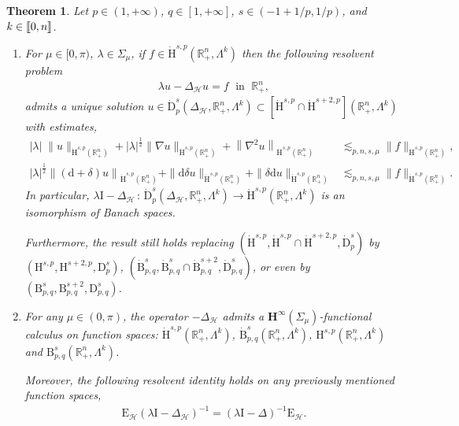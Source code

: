 \documentclass[10pt]{amsart}
\newtheorem{theo}{Theorem}[section]
\theoremstyle{definition}\newtheorem{defi}[theo]{Definition}\newtheorem{rema}[theo]{Remark}\newtheorem{exam}[theo]{Example}\newtheorem{exem}[theo]{Example}\newtheorem{nota}[theo]{Notation}
\newcommand{\bbR}{\mathbb{R}}
\newcommand{\rmH}{\mathrm{H}}%
\newcommand{\rmB}{\mathrm{B}}
\newcommand{\rmd}{\mathrm{d}}
\newcommand{\rmD}{\mathrm{D}}
\newcommand{\rmE}{\mathrm{E}}
\newcommand{\rmI}{\mathrm{I}}
\newcommand{\clH}{\mathcal{H}}
\newcommand{\bfH}{\mathbf{H}}
\newcommand{\llbracket}{\mathopen{[\mkern -2.7mu[}}
\newcommand{\rrbracket}{\mathclose{]\mkern -2.7mu]}}
\newcommand{\llb}{\llbracket}
\newcommand{\rrb}{\rrbracket}
\newcommand*{\romanenumi}{\renewcommand*{\theenumi}{\roman{enumi}}}
\begin{document}
\begin{theo}\label{thm:MetaThm1HodgeLaplacianRn+}
Let $p\in(1,+\infty)$, $q\in[1,+\infty]$, $s\in (-1+1/p,1/p)$, and $k\in\llb 0,n\rrb$.
\begin{enumerate}\romanenumi
\item\label{theo2.29.1} For $\mu\in[0,\pi)$, $\lambda\in\Sigma_\mu$, if $f\in \dot{\rmH}^{s,p}(\bbR^n_+,\Lambda^k)$ then the following resolvent problem
\begin{align*}
\lambda u - \Delta_{\clH} u = f\;\text{ in }\; \bbR^n_+,
\end{align*}
admits a unique solution $u\in \dot{\rmD}^{s}_{p}(\Delta_{\clH},\bbR^n_+,\Lambda^k) \subset[\dot{\rmH}^{s,p}\cap \dot{\rmH}^{s+2,p}](\bbR^n_+,\Lambda^k)$ with estimates,
\begin{align*}
|\lambda|\;\| u\|_{\dot{\rmH}^{s,p}\left(\bbR^n_+\right)}+|\lambda|^\frac{1}{2}\| \nabla u\|_{\dot{\rmH}^{s,p}\left(\bbR^n_+\right)}+\left\| \nabla^2 u\right\|_{\dot{\rmH}^{s,p}\left(\bbR^n_+\right)} &\lesssim_{p,n,s,\mu} \| f\|_{\dot{\rmH}^{s,p}\left(\bbR^n_+\right)} ,\\
|\lambda|^\frac{1}{2}\left\| (\rmd+\delta) u\right\|_{\dot{\rmH}^{s,p}\left(\bbR^n_+\right)}+\| \rmd\delta u\|_{\dot{\rmH}^{s,p}\left(\bbR^n_+\right)} + \| \delta\rmd u\|_{\dot{\rmH}^{s,p}\left(\bbR^n_+\right)} &\lesssim_{p,n,s,\mu} \| f\|_{\dot{\rmH}^{s,p}\left(\bbR^n_+\right)} .
\end{align*}
In particular, $\lambda \rmI -\Delta_{\clH}\,:\,\dot{\rmD}^{s}_{p}(\Delta_{\clH},\bbR^n_+,\Lambda^k)\longrightarrow \dot{\rmH}^{s,p}(\bbR^n_+,\Lambda^k)$ is an isomorphism of Banach spaces.

Furthermore, the result still holds replacing $(\dot{\rmH}^{s,p},\dot{\rmH}^{s,p}\cap \dot{\rmH}^{s+2,{p}},\dot{\rmD}^{s}_{p})$ by $({\rmH}^{s,p},{\rmH}^{s+2,p},{\rmD}^{s}_{p})$, $(\dot{\rmB}^{s}_{p,q},\dot{\rmB}^{s}_{p,q}\cap \dot{\rmB}^{s+2}_{p,q},\dot{\rmD}^{s}_{p,q})$, or even by $({\rmB}^{s}_{p,q},{\rmB}^{s+2}_{p,q},{\rmD}^{s}_{p,q})$.

\item\label{theo2.29.2} For any $\mu\in(0,\pi)$, the operator $-\Delta_{\clH}$ admits a $\bfH^\infty(\Sigma_\mu)$-functional calculus on function spaces: $\dot{\rmH}^{s,p}(\bbR^n_+,\Lambda^k)$,
$\dot{\rmB}^{s}_{p,q}(\bbR^n_+,\Lambda^k)$,
${\rmH}^{s,p}(\bbR^n_+,\Lambda^k)$ and
${\rmB}^{s}_{p,q}(\bbR^n_+,\Lambda^k)$.

Moreover, the following resolvent identity holds on any previously mentioned function spaces,
\begin{align*}
\rmE _{\clH}(\lambda \rmI  - \Delta_{\clH})^{-1} = (\lambda \rmI  - \Delta)^{-1}\rmE _{\clH}.
\end{align*}
\end{enumerate}
\end{theo}
\end{document}
